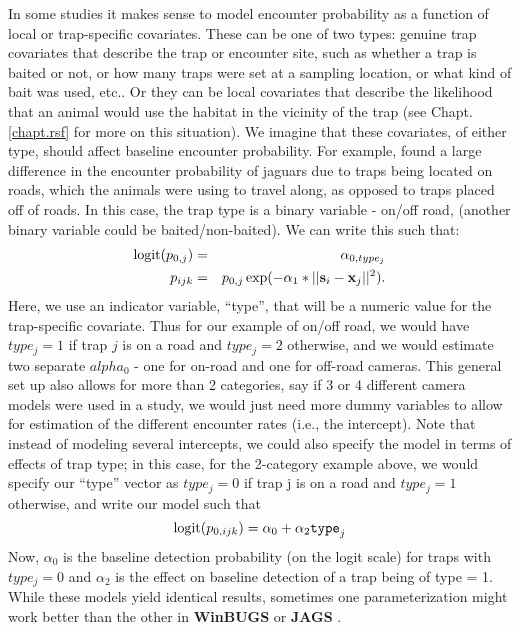 In some studies it makes sense to model encounter probability as a
function of local or trap-specific covariates. These can be one of two
types: genuine trap covariates that describe the trap or encounter site,
such as whether a trap is baited or not, or how many traps were set at a sampling location,
or what kind of bait was used, etc.. Or they can be local covariates that
describe the likelihood that an animal would use the habitat in the
vicinity of the trap (see Chapt. \ref{chapt.rsf} for more on this situation).
We imagine that these covariates, of either type, should affect
baseline encounter probability.
For example, \citet{sollmann_etal:2011}
found a large difference in the encounter probability of jaguars due to traps
being located on roads, which the animals were using to travel along, as
opposed to traps placed off of roads.  In this case, the trap
type is a binary variable - on/off road,
(another binary variable could be baited/non-baited).  We can write this such that:
\begin{eqnarray*}
\mbox{logit}(p_{0,j}) &= &\alpha_{0,type_j}  \\
p_{ijk}  & = & p_{0,j} \exp(- \alpha_1*||{\bf s}_{i}-{\bf x}_{j}||^2).
\end{eqnarray*}
Here, we use an indicator variable, ``type'', that will be a numeric
value for the trap-specific covariate. 
Thus for our example of on/off
road, we would have $type_j = 1$ if trap $j$ is on a road and $type_j =
2$ otherwise, and we would estimate two separate $alpha_{0}$ - one for
on-road and one for off-road cameras.  This general set up also allows
for more than 2 categories, say if 3 or 4 different camera models were
used in a study, we would just need more dummy variables to allow for
estimation of the different encounter rates (i.e., the intercept). 
Note that instead of modeling several
intercepts, we could also specify the model in terms of effects of
trap type; in this case, for the 2-category example above, we would
specify our ``type'' vector as $type_j = 0$ if trap j is on a road and
$type_j = 1$ otherwise, and write our model such that  
\[
\mbox{logit}(p_{0,ijk}) = \alpha_{0} + \alpha_{2} \mbox{\tt type}_{j}
\]
Now, $\alpha_{0}$ is the baseline detection probability (on the logit
scale) for traps with $type_j = 0$ and $\alpha_{2}$ is the effect on
baseline detection of a trap being of type = 1. While these models
yield identical results, sometimes one parameterization might work
better than the other in {\bf WinBUGS} or {\bf JAGS}
\citep{kery:2010}.

